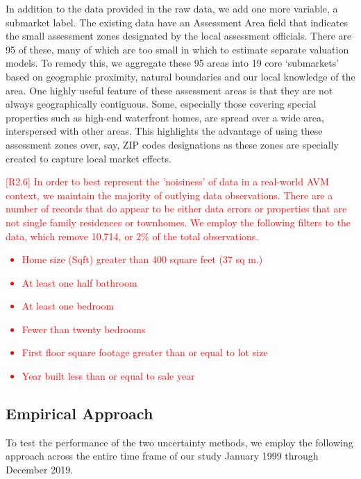 \documentclass[colTwo]{anon}
\theoremstyle{definition}
\begin{document}
In addition to the data provided in the raw data, we add one more variable, a submarket label.  The existing data have an Assessment Area field that indicates the small assessment zones designated by the local assessment officials.  There are 95 of these, many of which are too small in which to estimate separate valuation models.  To remedy this, we aggregate these 95 areas into 19 core ‘submarkets’ based on geographic proximity, natural boundaries and our local knowledge of the area. One highly useful feature of these assessment areas is that they are not always geographically contiguous.  Some, especially those covering special properties such as high-end waterfront homes, are spread over a wide area, interspersed with other areas.  This highlights the advantage of using these assessment zones over, say, ZIP codes designations as these zones are specially created to capture local market effects.

\textcolor{red}{
[R2.6] In order to best represent the 'noisiness' of data in a real-world AVM context, we maintain the majority of outlying data observations.  There are a number of records that do appear to be either data errors or properties that are not single family residences or townhomes.  We employ the following filters to the data, which remove 10,714, or 2\% of the total observations.}

\textcolor{red}{
\begin{itemize}
\item Home size (Sqft) greater than 400 square feet (37 sq m.)
\item At least one half bathroom
\item At least one bedroom
\item Fewer than twenty bedrooms
\item First floor square footage greater than or equal to lot size
\item Year built less than or equal to sale year 
\end{itemize}
}

\subsection{Empirical Approach}

To test the performance of the two uncertainty methods, we employ the following approach across the entire time frame of our study January 1999 through December 2019. 
\end{document}

